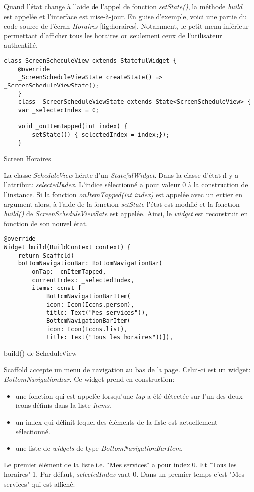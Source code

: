 Quand l'état change à l'aide de l'appel de fonction \textit{setState()}, la méthode \textit{build} est appelée et l'interface est mise-à-jour. En guise d'exemple, voici une partie du code source
de l'écran \textit{Horaires} \ref{fig:horaires}. Notamment, le petit menu inférieur permettant d'afficher tous les horaires ou seulement ceux de l'utilisateur authentifié.
\begin{listing}[h]
    \begin{verbatim}
class ScreenScheduleView extends StatefulWidget {
    @override
    _ScreenScheduleViewState createState() => _ScreenScheduleViewState();
    }
    class _ScreenScheduleViewState extends State<ScreenScheduleView> {
    var _selectedIndex = 0;
    
    void _onItemTapped(int index) {
        setState(() {_selectedIndex = index;});
    }
        \end{verbatim}
    \caption{Screen Horaires}
    \label{code:screenHoraires}
\end{listing}

La classe \textit{ScheduleView} hérite d'un \textit{StatefulWidget}. Dans la classe d'état il y a l'attribut: \textit{selectedIndex}. L'indice sélectionné a pour valeur 0 à la construction de l'instance.
Si la fonction \textit{onItemTapped(int index)} est appelée avec un entier en argument alors, à l'aide de la fonction \textit{setState} l'état est modifié
et la fonction \textit{build()} de \textit{ScreenScheduleViewSate} est appelée. Ainsi, le \textit{widget} est reconstruit en fonction de son nouvel état.

\begin{listing}[h]
    \begin{verbatim}
@override
Widget build(BuildContext context) {
    return Scaffold(
    bottomNavigationBar: BottomNavigationBar(
        onTap: _onItemTapped,
        currentIndex: _selectedIndex,
        items: const [
            BottomNavigationBarItem(
            icon: Icon(Icons.person),
            title: Text("Mes services")),
            BottomNavigationBarItem(
            icon: Icon(Icons.list),
            title: Text("Tous les horaires"))]),
        \end{verbatim}
    \caption{build() de ScheduleView}
    \label{code:buildHoraire}
\end{listing}

Scaffold accepte un menu de navigation au bas de la page. Celui-ci est un widget: \textit{BottomNavigationBar}. Ce widget prend en construction:
\begin{itemize}
    \item une fonction qui est appelée lorsqu'une \textit{tap} a été détectée sur l'un des deux icons définis dans la liste \textit{Items}.
    \item un index qui définit lequel des éléments de la liste est actuellement sélectionné.
    \item une liste de \textit{widgets} de type \textit{BottomNavigationBarItem}.
\end{itemize}
Le premier élément de la liste i.e. "Mes services" a pour index 0. Et "Tous les horaires" 1. Par défaut, \textit{selectedIndex} vaut 0. Dans un premier temps c'est "Mes services" qui est affiché.

